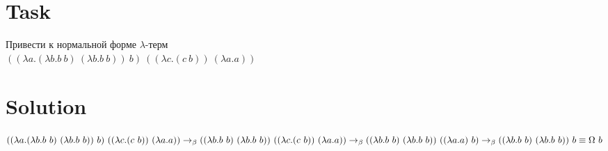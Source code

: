 \documentclass{article}
\begin{document}
\section{Task}
\Large
Привести к нормальной форме $\lambda$-терм  \\
$
((\lambda a.(\lambda b.b\ b) \ (\lambda b.b\ b)) \ b) \ ((\lambda c.(c \ b)) \ (\lambda a.a))
$

\section{Solution}
\Large
$
((\lambda a.(\lambda b.b\ b) \ (\lambda b.b\ b)) \ b) \ ((\lambda c.(c \ b)) \ (\lambda a.a)) \\
\rightarrow _{\beta} 
((\lambda b.b\ b) \ (\lambda b.b\ b)) \ ((\lambda c.(c \ b)) \ (\lambda a.a)) \\
\rightarrow _{\beta} 
((\lambda b.b\ b) \ (\lambda b.b\ b)) \ ((\lambda a.a) \ b) \\
\rightarrow _{\beta} 
((\lambda b.b\ b) \ (\lambda b.b\ b)) \ b
\equiv \Omega \ b
$
\end{document}
